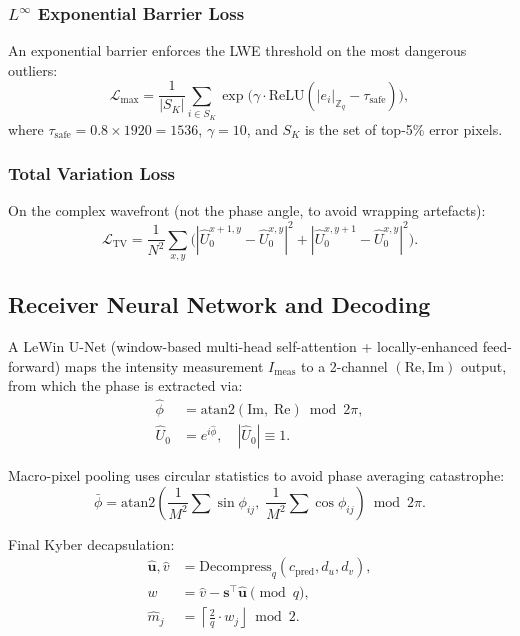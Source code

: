 \documentclass[11pt, a4paper]{article}
\theoremstyle{definition}
\theoremstyle{plain}
\newcommand{\Zq}{\mathbb{Z}_q}
\newcommand{\ceil}[1]{\left\lceil#1\right\rfloor}
\begin{document}
\subsubsection{$L^\infty$ Exponential Barrier Loss}
An exponential barrier enforces the LWE threshold on the most dangerous
outliers:
\begin{equation}
  \mathcal{L}_{\max} = \frac{1}{|S_K|}\sum_{i \in S_K}
  \exp\!\big(\gamma \cdot \mathrm{ReLU}(|e_i|_{\Zq} -
  \tau_{\mathrm{safe}})\big),
  \label{eq:loss_max}
\end{equation}
where $\tau_{\mathrm{safe}} = 0.8 \times 1920 = 1536$, $\gamma = 10$,
and $S_K$ is the set of top-5\% error pixels.

\subsubsection{Total Variation Loss}
On the complex wavefront (not the phase angle, to avoid wrapping artefacts):
\begin{equation}
  \mathcal{L}_{\mathrm{TV}} = \frac{1}{N^2}\sum_{x,y}
  \big(|\hat{U}_0^{x+1,y} - \hat{U}_0^{x,y}|^2 +
  |\hat{U}_0^{x,y+1} - \hat{U}_0^{x,y}|^2\big).
  \label{eq:loss_tv}
\end{equation}


\subsection{Receiver Neural Network and Decoding}
\label{sec:rx}

A LeWin U-Net (window-based multi-head self-attention + locally-enhanced
feed-forward) maps the intensity measurement $I_{\mathrm{meas}}$ to a
2-channel $(\mathrm{Re}, \mathrm{Im})$ output, from which the phase
is extracted via:
\begin{align}
  \hat{\phi} &= \mathrm{atan2}(\mathrm{Im},\; \mathrm{Re}) \bmod 2\pi,
  \label{eq:phase_extract}\\
  \hat{U}_0 &= e^{i\hat{\phi}}, \quad |\hat{U}_0| \equiv 1.
  \label{eq:wavefront}
\end{align}

Macro-pixel pooling uses circular statistics to avoid phase averaging
catastrophe:
\begin{equation}
  \bar{\phi} = \mathrm{atan2}\!\left(
    \frac{1}{M^2}\sum \sin\phi_{ij},\;
    \frac{1}{M^2}\sum \cos\phi_{ij}
  \right) \bmod 2\pi.
  \label{eq:circular_mean}
\end{equation}

Final Kyber decapsulation:
\begin{align}
  \hat{\mathbf{u}}, \hat{v} &= \mathrm{Decompress}_q(c_{\mathrm{pred}},
  d_u, d_v), \label{eq:decompress_final}\\
  w &= \hat{v} - \mathbf{s}^\top\hat{\mathbf{u}} \pmod{q},
  \label{eq:inner_product}\\
  \hat{m}_j &= \ceil{\frac{2}{q} \cdot w_j} \bmod 2.
  \label{eq:decode_msg}
\end{align}
\end{document}
